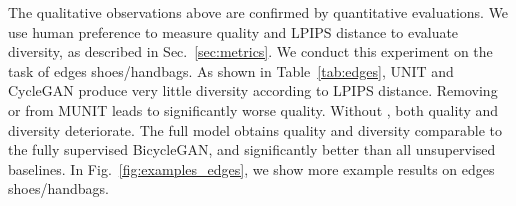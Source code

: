 \documentclass[runningheads]{llncs}
\begin{document}
	The qualitative observations above are confirmed by quantitative evaluations. We use human preference to measure quality and LPIPS distance to evaluate diversity, as described in Sec.~\ref{sec:metrics}. We conduct this experiment on the task of edges  shoes/handbags. As shown in Table~\ref{tab:edges}, UNIT and CycleGAN produce very little diversity according to LPIPS distance. Removing  or  from MUNIT leads to significantly worse quality. Without , both quality and diversity deteriorate. The full model obtains quality and diversity comparable to the fully supervised BicycleGAN, and significantly better than all unsupervised baselines.
	In Fig.~\ref{fig:examples_edges}, we show more example results on edges  shoes/handbags. 


	\begin{figure*}[!tb]
		\centering
		\small
		\newcommand{\sizea}{0.091\linewidth}
		

\end{figure*}
\end{document}
